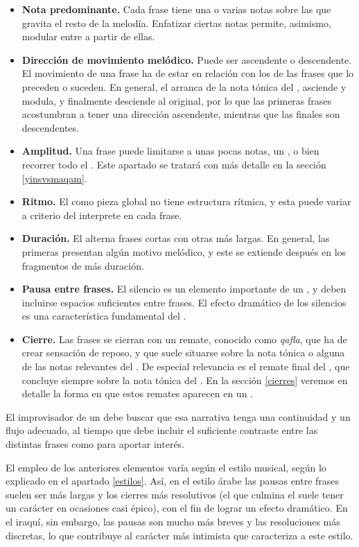 \begin{itemize}
\item \textbf{Nota predominante.} Cada frase tiene una o varias notas sobre las que gravita el resto de la melodía. Enfatizar ciertas notas permite, asimismo, modular entre \ashnas a partir de ellas.
\item \textbf{Dirección de movimiento melódico.} Puede ser ascendente o descendente. El movimiento de una frase ha de estar en relación con los de las frases que lo preceden o suceden. En general, el \taqsim arranca de la nota tónica del \maqamb, asciende y modula, y finalmente desciende al \maqam original, por lo que las primeras frases acostumbran a tener una dirección ascendente, mientras que las finales son descendentes.
\item \textbf{Amplitud.} Una frase puede limitarse a unas pocas notas, un \yinsb, o bien recorrer todo el \maqamb. Este apartado se tratará con más detalle en la sección \ref{yinsvsmaqam}.
\item \textbf{Ritmo.} El \taqsim como pieza global no tiene estructura rítmica, y esta puede variar a criterio del interprete en cada frase.
\item \textbf{Duración.} El \taqsim alterna frases cortas con otras más largas. En general, las primeras presentan algún motivo melódico, y este se extiende después en los fragmentos de más duración.
\item \textbf{Pausa entre frases.} El silencio es un elemento importante de un \taqsim, y deben incluirse espacios suficientes entre frases. El efecto dramático de los silencios es una característica fundamental del \taqsimb.
\item \textbf{Cierre.} Las frases se cierran con un remate, conocido como \emph{qafla}, que ha de crear sensación de reposo, y que suele situarse sobre la nota tónica o alguna de las notas relevantes del \maqamb. De especial relevancia es el remate final del \taqsimb, que concluye siempre sobre la nota tónica del \maqam. En la sección \ref{cierres} veremos en detalle la forma en que estos remates aparecen en un \taqsimb.
\end{itemize}

El improvisador de un \taqsim debe buscar que esa narrativa tenga una continuidad y un flujo adecuado, al tiempo que debe incluir el suficiente contraste entre las distintas frases como para aportar interés.

El empleo de los anteriores elementos varía según el estilo musical, según lo explicado en el apartado \ref{estilos}. Así, en el estilo árabe las pausas entre frases suelen ser más largas y los cierres más resolutivos (el que culmina el \taqsim suele tener un carácter en ocasiones casi épico), con el fin de lograr un efecto dramático. En el iraquí, sin embargo, las pausas son mucho más breves y las resoluciones más discretas, lo que contribuye al carácter más intimista que caracteriza a este estilo.

